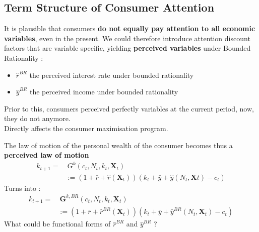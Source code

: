 \documentclass{beamer}
\begin{document}
\begin{frame}
    \tableofcontents[currentsection, hideothersubsections, sections=\value{section}]
\end{frame}

\subsection{Term Structure of Consumer Attention}
\begin{frame}{\subsecname}
    It is plausible that consumers \textbf{do not equally pay attention to all economic variables}, even in the present. 
    We could therefore introduce attention discount factors that are variable specific, yielding \textbf{perceived variables} under Bounded Rationality : 
    \begin{itemize}
        \item $\hat{r}^{BR}$ the perceived interest rate under bounded rationality
        \item $\hat{y}^{BR}$ the perceived income under bounded rationality
    \end{itemize}
    Prior to this, consumers perceived perfectly variables at the current period, now, they do not anymore. \\
    \hfill \linebreak
    Directly affects the consumer maximisation program. 
\end{frame}
    
\begin{frame}{\subsecname}
    The law of motion of the personal wealth of the consumer becomes thus a \textbf{perceived law of motion}
    \begin{equation}\tag{6}
        \begin{split}
            k_{t+1}= &\ G^{k}(c_{t},N_{t}, k_{t}, \bm{X}_{t}) \\ 
            & := (1+\bar{r}+\hat{r}(\bm{X}_{t}))(k_{t}+\bar{y}+\hat{y}(N_{t},\bm{X}t)-c_{t})
        \end{split}
    \end{equation}
    Turns into :    
    \begin{equation} \tag{49}
        \begin{split}
            k_{t+1}= &\  \textbf{G}^{k,BR}(c_{t},N_{t},k_{t},\textbf{X}_{t}) \\
            & := (1+\bar{r}+\hat{r}^{BR}(\textbf{X}_t))(k_{t}+\bar{y}+\hat{y}^{BR}(N_{t},\textbf{X}_t)-c_{t})
        \end{split}
    \end{equation}
    \hfill \linebreak
    What could be functional forms of $\hat{r}^{BR}$ and $\hat{y}^{BR}$ ?
\end{frame}
\end{document}
